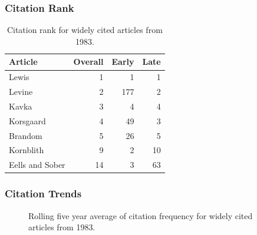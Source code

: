 \documentclass[
  10pt,
  letterpaper,
  DIV=11,
  numbers=noendperiod,
  twoside]{scrartcl}
\begin{document}
\subsubsection*{Citation Rank}\label{sec-rank-1983}

\begin{longtable}[]{@{}lrrr@{}}

\caption{\label{tbl-citation-rank-1983}Citation rank for widely cited
articles from 1983.}

\tabularnewline

\toprule\noalign{}
Article & Overall & Early & Late \\
\midrule\noalign{}
\endhead
\bottomrule\noalign{}
\endlastfoot
Lewis & 1 & 1 & 1 \\
Levine & 2 & 177 & 2 \\
Kavka & 3 & 4 & 4 \\
Korsgaard & 4 & 49 & 3 \\
Brandom & 5 & 26 & 5 \\
Kornblith & 9 & 2 & 10 \\
Eells and Sober & 14 & 3 & 63 \\

\end{longtable}

\subsubsection*{Citation Trends}\label{sec-trends-1983}

\begin{figure}


\caption{\label{fig-citation-spaghetti-1983}Rolling five year average of
citation frequency for widely cited articles from 1983.}

\end{figure}%
\end{document}
